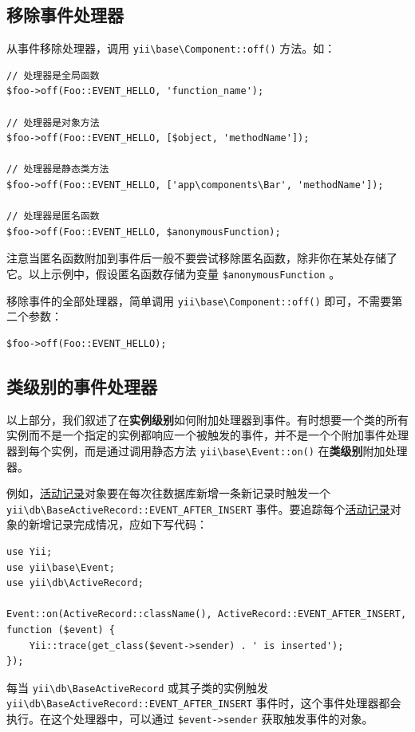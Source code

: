 \subsection{移除事件处理器}
从事件移除处理器，调用 \texttt{yii{\allowbreak{}\textbackslash}base{\allowbreak{}\textbackslash}Component\allowbreak{}::\allowbreak{}off()} 方法。如：

\lstset{language=php}\begin{lstlisting}
// 处理器是全局函数
$foo->off(Foo::EVENT_HELLO, 'function_name');

// 处理器是对象方法
$foo->off(Foo::EVENT_HELLO, [$object, 'methodName']);

// 处理器是静态类方法
$foo->off(Foo::EVENT_HELLO, ['app\components\Bar', 'methodName']);

// 处理器是匿名函数
$foo->off(Foo::EVENT_HELLO, $anonymousFunction);
\end{lstlisting}
注意当匿名函数附加到事件后一般不要尝试移除匿名函数，除非你在某处存储了它。以上示例中，假设匿名函数存储为变量 \lstinline|$anonymousFunction| 。

移除事件的全部处理器，简单调用 \texttt{yii{\allowbreak{}\textbackslash}base{\allowbreak{}\textbackslash}Component\allowbreak{}::\allowbreak{}off()} 即可，不需要第二个参数：

\lstset{language=php}\begin{lstlisting}
$foo->off(Foo::EVENT_HELLO);
\end{lstlisting}
\subsection{类级别的事件处理器}
以上部分，我们叙述了在\textbf{实例级别}如何附加处理器到事件。有时想要一个类的所有实例而不是一个指定的实例都响应一个被触发的事件，并不是一个个附加事件处理器到每个实例，而是通过调用静态方法 \texttt{yii{\allowbreak{}\textbackslash}base{\allowbreak{}\textbackslash}Event\allowbreak{}::\allowbreak{}on()} 在\textbf{类级别}附加处理器。

例如，\hyperref[db-active-record.md]{活动记录}对象要在每次往数据库新增一条新记录时触发一个 \texttt{yii{\allowbreak{}\textbackslash}db{\allowbreak{}\textbackslash}BaseActiveRecord\allowbreak{}::\allowbreak{}EVENT\_AFTER\_INSERT} 事件。要追踪每个\hyperref[db-active-record.md]{活动记录}对象的新增记录完成情况，应如下写代码：

\lstset{language=php}\begin{lstlisting}
use Yii;
use yii\base\Event;
use yii\db\ActiveRecord;

Event::on(ActiveRecord::className(), ActiveRecord::EVENT_AFTER_INSERT, function ($event) {
    Yii::trace(get_class($event->sender) . ' is inserted');
});
\end{lstlisting}
每当 \texttt{yii{\allowbreak{}\textbackslash}db{\allowbreak{}\textbackslash}BaseActiveRecord} 或其子类的实例触发 \texttt{yii{\allowbreak{}\textbackslash}db{\allowbreak{}\textbackslash}BaseActiveRecord\allowbreak{}::\allowbreak{}EVENT\_AFTER\_INSERT} 事件时，这个事件处理器都会执行。在这个处理器中，可以通过 \lstinline|$event->sender| 获取触发事件的对象。

